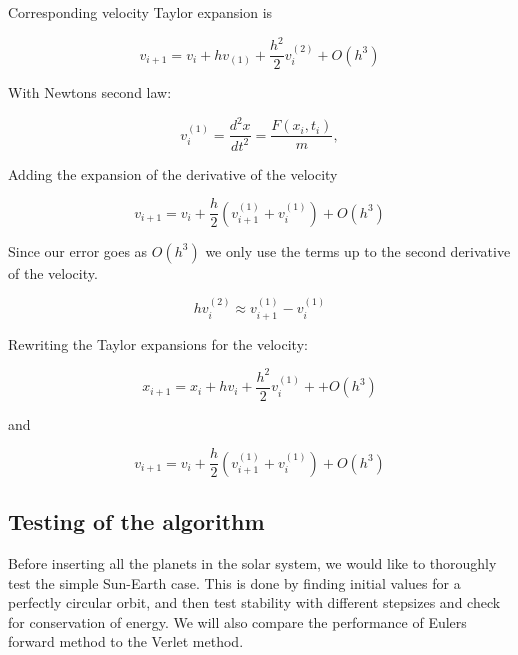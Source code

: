 \documentclass[../main.tex]{subfiles}
\begin{document}
Corresponding velocity Taylor expansion is

\begin{equation}
  v_{i+1} = v_i + hv_{(1)} + \frac{h^2}{2} v_i^{(2)} + O(h^3)
\end{equation}

With Newtons second law:

\begin{equation}
  v_i^{(1)} = \frac{d^2x}{dt^2} = \frac{F(x_i, t_i)}{m},
\end{equation}

Adding the expansion of the derivative of the velocity

\begin{equation}
  v_{i+1} = v_i + \frac{h}{2}\left(v_{i+1}^{(1)} + v_i^{(1)}\right) + O(h^3)
\end{equation}

Since our error goes as $O(h^3)$ we only use the terms up to the second derivative of the velocity.

\begin{equation}
  hv_i^{(2)}\approx v_{i+1}^{(1)} - v_i^{(1)}
\end{equation}

Rewriting the Taylor expansions for the velocity:

\begin{equation}
  x_{i+1} = x_i + hv_i + \frac{h^2}{2} v_i^{(1)} + + O(h^3)
\end{equation}

and

\begin{equation}
  v_{i+1} = v_i + \frac{h}{2} \left(v_{i+1}^{(1)} + v_i^{(1)}\right) + O(h^3)
\end{equation}

\subsection{Testing of the algorithm}
Before inserting all the planets in the solar system, we would like to thoroughly test the simple Sun-Earth case. This is done by finding initial values for a perfectly circular orbit, and then test stability with different stepsizes and check for conservation of energy. We will also compare the performance of Eulers forward method to the Verlet method.
\end{document}
